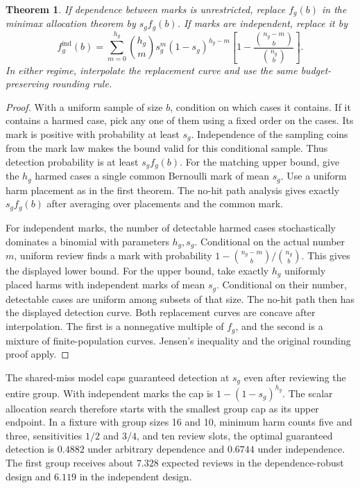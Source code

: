 \documentclass[11pt]{article}
\newtheorem{theorem}{Theorem}
\begin{document}
\begin{theorem}
If dependence between marks is unrestricted, replace $f_g(b)$
in the minimax allocation theorem by $s_g f_g(b)$. If marks are
independent, replace it by
\[
 f^{\mathrm{ind}}_g(b)
 =\sum_{m=0}^{h_g}\binom{h_g}{m}
   s_g^m(1-s_g)^{h_g-m}
   \left[1-\frac{\binom{n_g-m}{b}}{\binom{n_g}{b}}\right].
\]
In either regime, interpolate the replacement curve and use the
same budget-preserving rounding rule.
\end{theorem}
\begin{proof}
With a uniform sample of size $b$, condition on which cases it
contains. If it contains a harmed case, pick any one of them
using a fixed order on the cases. Its mark is positive with
probability at least $s_g$. Independence of the sampling coins
from the mark law makes the bound valid for this conditional
sample. Thus detection probability is at least $s_g f_g(b)$.
For the matching upper bound, give the $h_g$ harmed cases a
single common Bernoulli mark of mean $s_g$. Use a uniform harm
placement as in the first theorem. The no-hit path analysis
gives exactly $s_g f_g(b)$ after averaging over placements and
the common mark.

For independent marks, the number of detectable harmed cases
stochastically dominates a binomial with parameters $h_g,s_g$.
Conditional on the actual number $m$, uniform review finds a mark
with probability $1-\binom{n_g-m}{b}/\binom{n_g}{b}$. This gives
the displayed lower bound. For the upper bound, take exactly
$h_g$ uniformly placed harms with independent marks of mean $s_g$.
Conditional on their number, detectable cases are uniform
among subsets of that size. The no-hit path then has the
displayed detection curve. Both replacement curves are concave
after interpolation. The first is a nonnegative multiple of
$f_g$, and the second is a mixture of finite-population curves.
Jensen's inequality and the original rounding proof apply.
\end{proof}

The shared-miss model caps guaranteed detection at $s_g$ even
after reviewing the entire group. With independent marks the
cap is $1-(1-s_g)^{h_g}$. The scalar allocation search therefore
starts with the smallest group cap as its upper endpoint.
In a fixture with group sizes 16 and 10, minimum harm counts
five and three, sensitivities $1/2$ and $3/4$, and ten review
slots, the optimal guaranteed detection is $0.4882$ under
arbitrary dependence and $0.6744$ under independence. The
first group receives about $7.328$ expected reviews in the
dependence-robust design and $6.119$ in the independent design.
\end{document}
